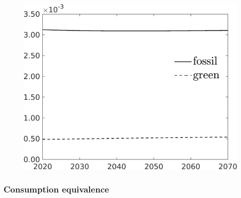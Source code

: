 \begin{figure}[h!!]
\begin{minipage}[]{0.32\textwidth}
		\includegraphics[width=1\textwidth]{../../codding_model/own_basedOnFried/optimalPol_190722_tidiedUp/figures/all_10Aout22/SingleJointTOT_regime3_OPT_NOT_NoTaus_LabourInp_spillover0_noskill0_sep1_xgrowth0_extern0_PV1_etaa0.79_lgd1.png}
	\end{minipage}
\end{figure} 



\subsubsection{Consumption equivalence}

